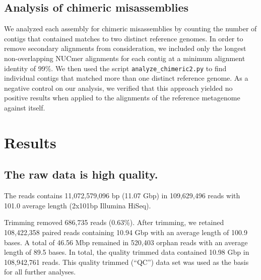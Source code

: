 \documentclass[11pt]{article}
\begin{document}
\subsection*{Analysis of chimeric misassemblies}


We analyzed each assembly for chimeric misassemblies by counting the
number of contigs that contained matches to two distinct reference
genomes.  In order to remove secondary alignments from consideration,
we included only the longest non-overlapping NUCmer
alignments for each contig at a minimum alignment identity of 99\%.
We then used the script {\tt analyze\_chimeric2.py} to find individual
contigs that matched more than one distinct reference genome.  As a
negative control on our analysis, we verified that this approach
yielded no positive results when applied to the alignments of the
reference metagenome against itself.



\section*{Results}

\subsection*{The raw data is high quality.}

The reads contains 11,072,579,096 bp (11.07 Gbp) in 109,629,496 reads
with 101.0 average length (2x101bp Illumina HiSeq).

Trimming removed 686,735 reads (0.63\%).  After trimming, we retained
108,422,358 paired reads containing 10.94 Gbp with an average length of
100.9 bases. A total of 46.56 Mbp remained in 520,403 orphan reads with
an average length of 89.5 bases. In total, the quality trimmed data
contained 10.98 Gbp in 108,942,761 reads.  This quality trimmed (``QC'')
data set was used as the basis for all further analyses.
\end{document}

